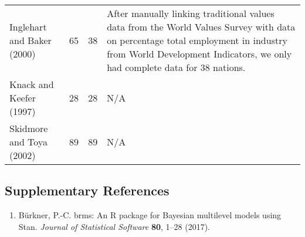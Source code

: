 \documentclass[
  man,floatsintext]{apa6}
\providecommand{\tightlist}{%
  \setlength{\itemsep}{0pt}\setlength{\parskip}{0pt}}
\begin{document}
\begin{center}
\begin{ThreePartTable}
{\begin{longtable}{m{2cm}m{2cm}m{2cm}m{9cm}}
Inglehart and Baker (2000) & 65 & 38 & After manually linking traditional values data from the World Values Survey with data on percentage total employment in industry from World Development Indicators, we only had complete data for 38 nations.\\
Knack and Keefer (1997) & 28 & 28 & N/A\\
Skidmore and Toya (2002) & 89 & 89 & N/A\\
\bottomrule
\end{longtable}

}

\end{ThreePartTable}
\end{center}

\newpage

\hypertarget{supplementary-references}{%
\subsection{Supplementary References}\label{supplementary-references}}

\begin{enumerate}
\def\labelenumi{\arabic{enumi}.}
\tightlist
\item
  Bürkner, P.-C. brms: An R package for Bayesian multilevel models using Stan. \emph{Journal of Statistical Software} \textbf{80}, 1--28 (2017).
\end{enumerate}
\end{document}
